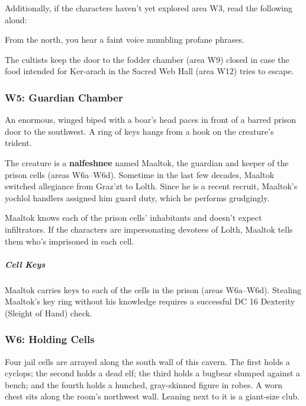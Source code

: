 \documentclass[10pt,a4paper,twoside,bg=print,twocolumn,openany,nodeprecatedcode]{dndbook}
\begin{document}
Additionally, if the characters haven't yet explored area W3, read the following aloud:

\begin{DndReadAloud}{}
From the north, you hear a faint voice mumbling profane phrases.

\end{DndReadAloud}

The cultists keep the door to the fodder chamber (area W9) closed in case the food intended for Ker-arach in the Sacred Web Hall (area W12) tries to escape.

\subsubsection{W5: Guardian Chamber}
\begin{DndReadAloud}{}
An enormous, winged biped with a boar's head paces in front of a barred prison door to the southwest. A ring of keys hangs from a hook on the creature's trident.

\end{DndReadAloud}

The creature is a \textbf{nalfeshnee} named Maaltok, the guardian and keeper of the prison cells (areas W6a–W6d). Sometime in the last few decades, Maaltok switched allegiance from Graz'zt to Lolth. Since he is a recent recruit, Maaltok's yochlol handlers assigned him guard duty, which he performs grudgingly.

Maaltok knows each of the prison cells' inhabitants and doesn't expect infiltrators. If the characters are impersonating devotees of Lolth, Maaltok tells them who's imprisoned in each cell.

\subparagraph{Cell Keys}
Maaltok carries keys to each of the cells in the prison (areas W6a–W6d). Stealing Maaltok's key ring without his knowledge requires a successful DC 16 Dexterity (Sleight of Hand) check.

\subsubsection{W6: Holding Cells}
\begin{DndReadAloud}{}
Four jail cells are arrayed along the south wall of this cavern. The first holds a cyclops; the second holds a dead elf; the third holds a bugbear slumped against a bench; and the fourth holds a hunched, gray-skinned figure in robes. A worn chest sits along the room's northwest wall. Leaning next to it is a giant-size club.

\end{DndReadAloud}
\end{document}
